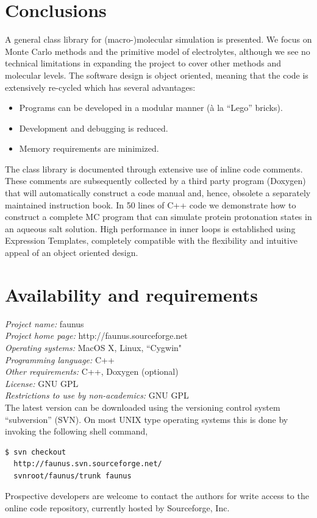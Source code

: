 \documentclass[10pt]{bmc_article}
\newenvironment{bmcformat}{\begin{raggedright}\baselineskip20pt\sloppy\setboolean{publ}{false}}{\end{raggedright}\baselineskip20pt\sloppy}
\begin{document}
\begin{bmcformat}
\section*{Conclusions}
A general class library for (macro-)molecular simulation is presented.
We focus on Monte Carlo methods and the primitive model of electrolytes, although we see no technical limitations in expanding the project to cover other methods and molecular levels.
The software design is object oriented, meaning that the code is extensively re-cycled which has several advantages:
\begin{itemize}
\item Programs can be developed in a modular manner (\`a la ``Lego'' bricks).
\item Development and debugging is reduced.
\item Memory requirements are minimized.
\end{itemize}
The class library is documented through extensive use of inline code comments.
These comments are subsequently collected by a third party program (Doxygen) that will automatically construct a code manual and, hence, obsolete a separately maintained instruction book.
In 50 lines of C++ code we demonstrate how to construct a complete MC program that can simulate protein protonation states in an aqueous salt solution.
High performance in inner loops is established using Expression Templates, completely compatible with the flexibility and intuitive appeal of an object oriented design.

\section*{Availability and requirements}
\textsl{Project name:} faunus\\
\textsl{Project home page:} http://faunus.sourceforge.net\\
\textsl{Operating systems:} MacOS X, Linux, ``Cygwin"\\
\textsl{Programming language:} C++\\
\textsl{Other requirements:} C++, Doxygen (optional)\\
\textsl{License:} GNU GPL\\
\textsl{Restrictions to use by non-academics:} GNU GPL\\

The latest version can be downloaded using the versioning control system ``subversion'' (SVN).
On most UNIX type operating systems this is done by invoking the following shell command,
\begin{verbatim}
$ svn checkout
  http://faunus.svn.sourceforge.net/
  svnroot/faunus/trunk faunus
\end{verbatim}
Prospective developers are welcome to contact the authors for write access to the online code repository, currently hosted by Sourceforge, Inc.



\end{bmcformat}
\end{document}
